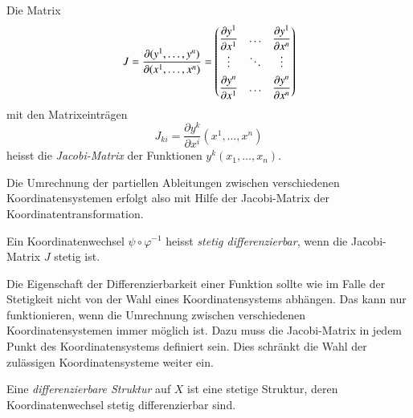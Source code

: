 \begin{definition}
Die Matrix
\[
J
=
\frac{\partial(y^1,\dots,y^n)}{\partial(x^1,\dots,x^n)}
=
\bgroup
\renewcommand\arraystretch{1.8}
\begin{pmatrix}
\displaystyle\frac{\partial y^1}{\partial x^1}&\dots&\displaystyle\frac{\partial y^1}{\partial x^n}\\
\vdots&\ddots&\vdots\\
\displaystyle\frac{\partial y^n}{\partial x^1}&\dots&\displaystyle\frac{\partial y^n}{\partial x^n}\\
\end{pmatrix}
\egroup
\]
mit den Matrixeinträgen
\[
J_{ki}
=
\frac{\partial y^k}{\partial x^i}(x^1,\dots,x^n)
\]
heisst die {\em Jacobi-Matrix} der Funktionen $y^k(x_1,\dots,x_n)$.
%
\end{definition}

Die Umrechnung der partiellen Ableitungen zwischen verschiedenen
Koordinatensystemen erfolgt also mit Hilfe der Jacobi-Matrix der
Koordinatentransformation.

\begin{definition}
Ein Koordinatenwechsel $\psi\circ\varphi^{-1}$ heisst
%
{\em stetig differenzierbar}, wenn die Jacobi-Matrix $J$
stetig ist.
\end{definition}

Die Eigenschaft der Differenzierbarkeit einer Funktion sollte wie
im Falle der Stetigkeit nicht von der Wahl eines Koordinatensystems
abhängen.
Das kann nur funktionieren, wenn die Umrechnung zwischen verschiedenen
Koordinatensystemen immer möglich ist.
Dazu muss die Jacobi-Matrix in jedem Punkt des Koordinatensystems
definiert sein.
Dies schränkt die Wahl der zulässigen Koordinatensysteme weiter ein.

\begin{definition}
\label{buch:koordinaten:koordinaten:definition:diffbareestruktur}
Eine {\em differenzierbare Struktur} auf $X$ ist eine stetige Struktur,
%
%
deren Koordinatenwechsel stetig differenzierbar sind.
\end{definition}

